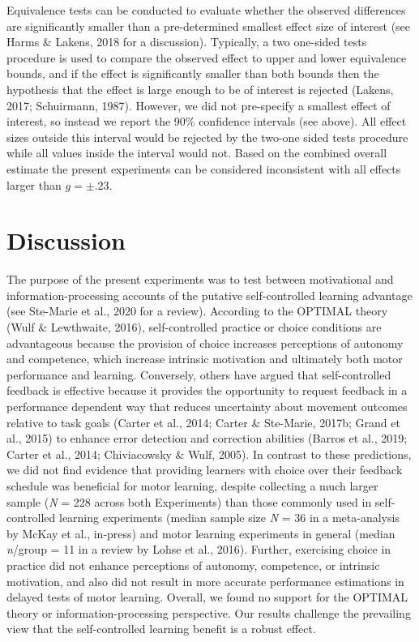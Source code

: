 \documentclass[
  man, donotrepeattitle,floatsintext]{apa7}
\begin{document}
Equivalence tests can be conducted to evaluate whether the observed differences are significantly smaller than a pre-determined smallest effect size of interest (see Harms \& Lakens, 2018 for a discussion). Typically, a two one-sided tests procedure is used to compare the observed effect to upper and lower equivalence bounds, and if the effect is significantly smaller than both bounds then the hypothesis that the effect is large enough to be of interest is rejected (Lakens, 2017; Schuirmann, 1987). However, we did not pre-specify a smallest effect of interest, so instead we report the 90\% confidence intervals (see above). All effect sizes outside this interval would be rejected by the two-one sided tests procedure while all values inside the interval would not. Based on the combined overall estimate the present experiments can be considered inconsistent with all effects larger than \(g = \pm.23\).

\hypertarget{discussion}{%
\section{Discussion}\label{discussion}}

The purpose of the present experiments was to test between motivational and information-processing accounts of the putative self-controlled learning advantage (see Ste-Marie et al., 2020 for a review). According to the OPTIMAL theory (Wulf \& Lewthwaite, 2016), self-controlled practice or choice conditions are advantageous because the provision of choice increases perceptions of autonomy and competence, which increase intrinsic motivation and ultimately both motor performance and learning. Conversely, others have argued that self-controlled feedback is effective because it provides the opportunity to request feedback in a performance dependent way that reduces uncertainty about movement outcomes relative to task goals (Carter et al., 2014; Carter \& Ste-Marie, 2017b; Grand et al., 2015) to enhance error detection and correction abilities (Barros et al., 2019; Carter et al., 2014; Chiviacowsky \& Wulf, 2005). In contrast to these predictions, we did not find evidence that providing learners with choice over their feedback schedule was beneficial for motor learning, despite collecting a much larger sample (\emph{N} = 228 across both Experiments) than those commonly used in self-controlled learning experiments (median sample size \emph{N} = 36 in a meta-analysis by McKay et al., in-press) and motor learning experiments in general (median \emph{n}/group = 11 in a review by Lohse et al., 2016). Further, exercising choice in practice did not enhance perceptions of autonomy, competence, or intrinsic motivation, and also did not result in more accurate performance estimations in delayed tests of motor learning. Overall, we found no support for the OPTIMAL theory or information-processing perspective. Our results challenge the prevailing view that the self-controlled learning benefit is a robust effect.
\end{document}
